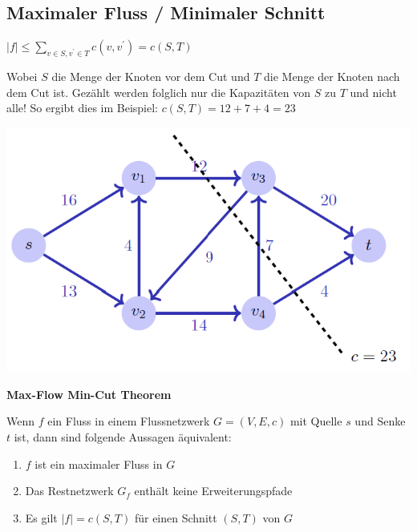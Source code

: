 \vspace{-4pt}
\begin{sectionbox}
\subsection{Maximaler Fluss / Minimaler Schnitt}\smallskip
\begin{emphbox}
$|f| \leq \sum\limits_{v \in S, v^{\prime} \in T} c\left(v, v^{\prime}\right)=c(S, T)$
\end{emphbox}
Wobei $S$ die Menge der Knoten vor dem Cut und $T$ die Menge der Knoten nach dem Cut ist. Gezählt werden folglich nur die Kapazitäten von $S$ zu $T$ und nicht alle! So ergibt dies im Beispiel: $c(S,T)=12+7+4=23$\par\smallskip

\begin{center}
    \includegraphics[width = 0.9\columnwidth]{../img/maxFlow.png}
\end{center}\par\smallskip

\begin{greenbox}
\textbf{Max-Flow Min-Cut Theorem}\par
Wenn $f$ ein Fluss in einem Flussnetzwerk $G=(V, E, c)$ mit Quelle $s$ und Senke $t$ ist, dann sind folgende Aussagen äquivalent:
\begin{enumerate}
    \item $f$ ist ein maximaler Fluss in $G$
    \item Das Restnetzwerk $G_{f}$ enthält keine Erweiterungspfade
    \item Es gilt $|f|=c(S, T)$ für einen Schnitt $(S, T)$ von $G$
\end{enumerate}
\end{greenbox}
\end{sectionbox}
\vspace{-4pt}

